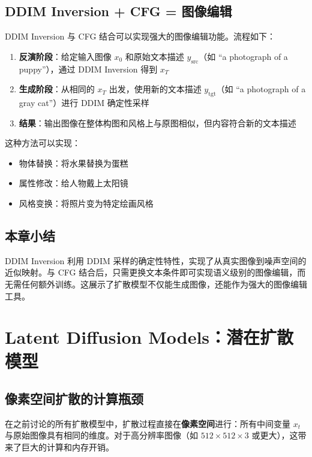 \documentclass[a4paper]{article}
\begin{document}
\subsection{DDIM Inversion + CFG = 图像编辑}

DDIM Inversion 与 CFG 结合可以实现强大的图像编辑功能。流程如下：

\begin{enumerate}
    \item \textbf{反演阶段}：给定输入图像 $x_0$ 和原始文本描述 $y_{\text{src}}$（如 ``a photograph of a puppy''），通过 DDIM Inversion 得到 $x_T$
    \item \textbf{生成阶段}：从相同的 $x_T$ 出发，使用新的文本描述 $y_{\text{tgt}}$（如 ``a photograph of a gray cat''）进行 DDIM 确定性采样
    \item \textbf{结果}：输出图像在整体构图和风格上与原图相似，但内容符合新的文本描述
\end{enumerate}

这种方法可以实现：
\begin{itemize}
    \item 物体替换：将水果替换为蛋糕
    \item 属性修改：给人物戴上太阳镜
    \item 风格变换：将照片变为特定绘画风格
\end{itemize}

\subsection{本章小结}

DDIM Inversion 利用 DDIM 采样的确定性特性，实现了从真实图像到噪声空间的近似映射。与 CFG 结合后，只需更换文本条件即可实现语义级别的图像编辑，而无需任何额外训练。这展示了扩散模型不仅能生成图像，还能作为强大的图像编辑工具。

\newpage
\section{Latent Diffusion Models：潜在扩散模型}

\subsection{像素空间扩散的计算瓶颈}

在之前讨论的所有扩散模型中，扩散过程直接在\textbf{像素空间}进行：所有中间变量 $x_t$ 与原始图像具有相同的维度。对于高分辨率图像（如 $512\times512\times3$ 或更大），这带来了巨大的计算和内存开销。
\end{document}
